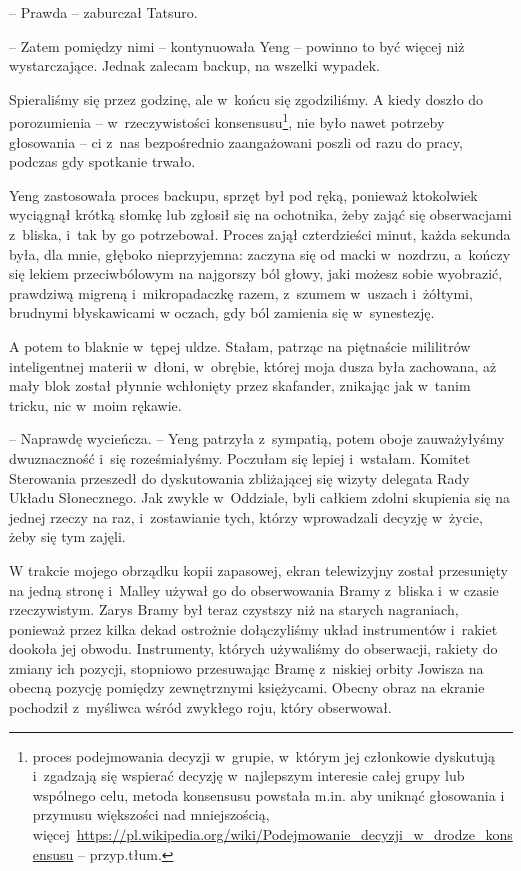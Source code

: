 \documentclass[oneside,polish,11pt,sfheadings]{mwbk}
\begin{document}
-- Prawda -- zaburczał Tatsuro.

-- Zatem pomiędzy nimi -- kontynuowała Yeng -- powinno to być więcej niż
wystarczające. Jednak zalecam backup, na wszelki wypadek.

Spieraliśmy się przez godzinę, ale w~końcu się zgodziliśmy. A kiedy
doszło do porozumienia -- w~rzeczywistości konsensusu\footnote{ proces
podejmowania decyzji w~grupie, w~którym jej członkowie dyskutują i~zgadzają się wspierać decyzję w~najlepszym interesie całej grupy lub
wspólnego celu, metoda konsensusu powstała m.in. aby uniknąć głosowania
i przymusu większości nad mniejszością,
więcej~\url{https://pl.wikipedia.org/wiki/Podejmowanie\_decyzji\_w\_drodze\_konsensusu}
-- przyp.tłum.}, nie było nawet potrzeby głosowania -- ci z~nas
bezpośrednio zaangażowani poszli od razu do pracy, podczas gdy spotkanie
trwało.

Yeng zastosowała proces backupu, sprzęt był pod ręką, ponieważ
ktokolwiek wyciągnął krótką słomkę lub zgłosił się na ochotnika, żeby
zająć się obserwacjami z~bliska, i~tak by go potrzebował. Proces zajął
czterdzieści minut, każda sekunda była, dla mnie, głęboko nieprzyjemna:
zaczyna się od macki w~nozdrzu, a~kończy się lekiem przeciwbólowym na
najgorszy ból głowy, jaki możesz sobie wyobrazić, prawdziwą migreną i~mikropadaczkę razem, z~szumem w~uszach i~żółtymi, brudnymi błyskawicami
w oczach, gdy ból zamienia się w~synestezję.

A potem to blaknie w~tępej uldze. Stałam, patrząc na piętnaście
mililitrów inteligentnej materii w~dłoni, w~obrębie, której moja dusza
była zachowana, aż mały blok został płynnie wchłonięty przez skafander,
znikając jak w~tanim tricku, nic w~moim rękawie.

-- Naprawdę wycieńcza. -- Yeng patrzyła z~sympatią, potem oboje
zauważyłyśmy dwuznaczność i~się roześmiałyśmy. Poczułam się lepiej i~wstałam. Komitet Sterowania przeszedł do dyskutowania zbliżającej się
wizyty delegata Rady Układu Słonecznego. Jak zwykle w~Oddziale, byli
całkiem zdolni skupienia się na jednej rzeczy na raz, i~zostawianie
tych, którzy wprowadzali decyzję w~życie, żeby się tym zajęli.

W trakcie mojego obrządku kopii zapasowej, ekran telewizyjny został
przesunięty na jedną stronę i~Malley używał go do obserwowania Bramy z~bliska i~w czasie rzeczywistym. Zarys Bramy był teraz czystszy niż na
starych nagraniach, ponieważ przez kilka dekad ostrożnie dołączyliśmy
układ instrumentów i~rakiet dookoła jej obwodu. Instrumenty, których
używaliśmy do obserwacji, rakiety do zmiany ich pozycji, stopniowo
przesuwając Bramę z~niskiej orbity Jowisza na obecną pozycję pomiędzy
zewnętrznymi księżycami. Obecny obraz na ekranie pochodził z~myśliwca
wśród zwykłego roju, który obserwował.
\end{document}
